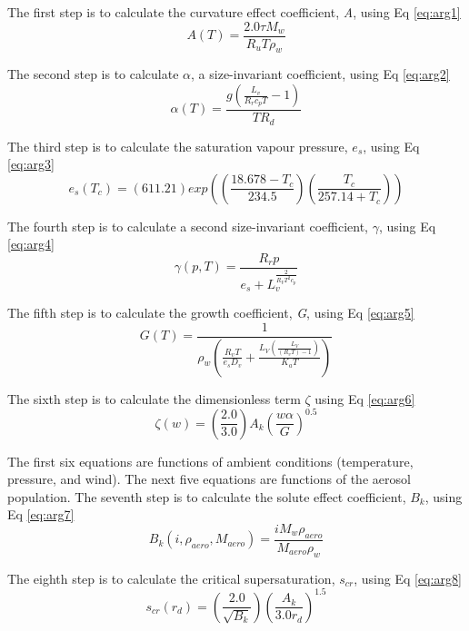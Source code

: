 The first step is to calculate the curvature effect coefficient, \textit{A}, using Eq \ref{eq:arg1} 
\begin{equation} \label{eq:arg1}
A(T) = \frac{2.0 \tau M_w}{R_u T \rho_w}	
\end{equation}

The second step is to calculate $\alpha$, a size-invariant coefficient, using Eq \ref{eq:arg2}
\begin{equation} \label{eq:arg2}
\alpha(T) = \frac{g (\frac{L_v}{R_r c_p T} - 1)}{T R_d}
\end{equation}

The third step is to calculate the saturation vapour pressure, $e_s$, using Eq \ref{eq:arg3}
\begin{equation} \label{eq:arg3}
e_s(T_c) = (611.21) exp\left((\frac{18.678-T_c}{234.5})(\frac{T_c}{257.14 + T_c})\right)
\end{equation}

The fourth step is to calculate a second size-invariant coefficient, $\gamma$, using Eq \ref{eq:arg4}
\begin{equation} \label{eq:arg4}
\gamma(p,T) = \frac{R_r p}{e_s + L_v^{\frac{2}{R_V T^{2} c_p}}}
\end{equation}

The fifth step is to calculate the growth coefficient, \textit{G}, using Eq \ref{eq:arg5}
\begin{equation} \label{eq:arg5}
G(T) = \frac{1}{\rho_w \left(\frac{R_v T}{e_s D_v} + \frac{L_V(\frac{L_V}{(R_v T)-1})}{K_a T}\right)}
\end{equation}

The sixth step is to calculate the dimensionless term $\zeta$ using Eq \ref{eq:arg6}
\begin{equation} \label{eq:arg6}
\zeta(w) = \left(\frac{2.0}{3.0}\right) A_k \left(\frac{w \alpha}{G}\right)^{0.5}
\end{equation}

The first six equations are functions of ambient conditions (temperature, pressure, and wind). The next five equations are functions of the aerosol population. The seventh step is to calculate the solute effect coefficient, $B_k$, using Eq \ref{eq:arg7}
\begin{equation} \label{eq:arg7}
B_k(i,\rho_{aero},M_{aero}) = \frac{i M_w \rho_{aero}}{M_{aero} \rho_w}
\end{equation}

The eighth step is to calculate the critical supersaturation, $s_{cr}$, using Eq \ref{eq:arg8}
\begin{equation} \label{eq:arg8}
s_{cr}(r_d) = \left(\frac{2.0}{\sqrt{B_k}}\right) \left(\frac{A_k}{3.0 r_d}\right)^{1.5}
\end{equation}

